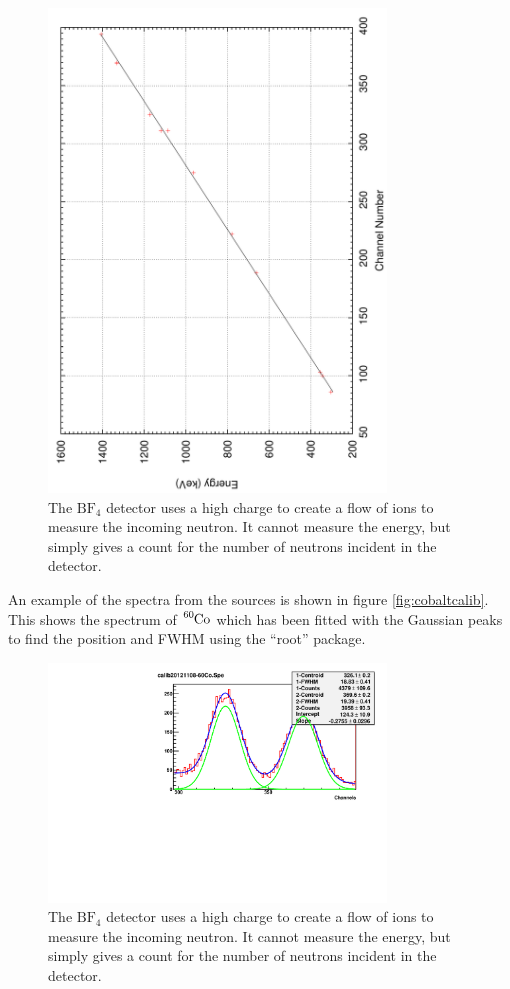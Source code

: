 \begin{figure}[ht]
	\centering
	\includegraphics[angle=270,width=0.8\textwidth]{calibration1NaI.pdf}
	\caption{The $\text{BF}_4$ detector uses a high charge to create a flow of ions to measure the incoming neutron. It cannot measure the energy, but simply gives a count for the number of neutrons incident in the detector.\label{fig:naicalib}}
\end{figure}
An example of the spectra from the sources is shown in figure \ref{fig:cobaltcalib}. This shows the spectrum of $\ce{^{60}Co}$ which has been fitted with the Gaussian peaks to find the position and FWHM using the ``root'' package.

\begin{figure}[ht]
	\centering
	\includegraphics[angle=270,width=0.8\textwidth]{calib20121113-60Co.pdf}
	\caption{The $\text{BF}_4$ detector uses a high charge to create a flow of ions to measure the incoming neutron. It cannot measure the energy, but simply gives a count for the number of neutrons incident in the detector.\label{fig:naicalib}}
\end{figure}
